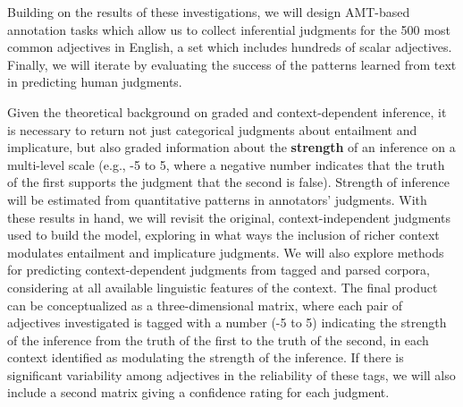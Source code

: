 \documentclass[10pt]{article}
\begin{document}
Building on the results of these investigations, we will design AMT-based annotation tasks which allow us to collect inferential judgments for the 500 most common adjectives in English, a set which includes hundreds of scalar adjectives. Finally, we will iterate by evaluating the success of the patterns learned from text in predicting human judgments.

Given the theoretical background on graded and context-dependent inference, it is necessary to return not just categorical judgments about entailment and implicature, but also graded information about the \textbf{strength} of an inference on a multi-level scale (e.g., -5 to 5, where a negative number indicates that the truth of the first supports the judgment that the second is false).  Strength of inference will be estimated from quantitative patterns in annotators' judgments. With these results in hand, we will revisit the original, context-independent judgments used to build the model, exploring in what ways the inclusion of richer context modulates entailment and implicature judgments. We will also explore methods for predicting context-dependent judgments from tagged and parsed corpora, considering at all available linguistic features of the context. The final product can be conceptualized as a three-dimensional matrix, where each pair of adjectives investigated is tagged with a number (-5 to 5) indicating the strength of the inference from the truth of the first to the truth of the second, in each context identified as modulating the strength of the inference. If there is significant variability among adjectives in the reliability of these tags, we will also include a second matrix giving a confidence rating for each judgment.
\end{document}
